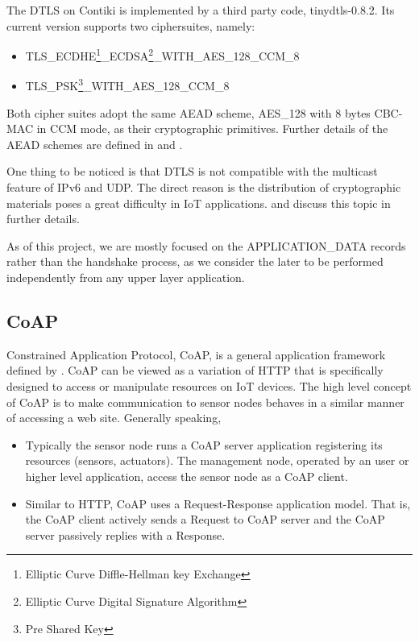 The DTLS on Contiki is implemented by a third party code, tinydtls-0.8.2\cite{tinydtls}. Its current version supports two ciphersuites, namely:
\begin{itemize}
	\item TLS\_ECDHE\footnote{Elliptic Curve Diffle-Hellman key Exchange}\_ECDSA\footnote{Elliptic Curve Digital Signature Algorithm}\_WITH\_AES\_128\_CCM\_8\cite{rfc7251}
	\item TLS\_PSK\footnote{Pre Shared Key}\_WITH\_AES\_128\_CCM\_8\cite{rfc6655}
\end{itemize}
Both cipher suites adopt the same AEAD scheme, AES\_128 with 8 bytes CBC-MAC in CCM mode, as their cryptographic primitives. Further details of the AEAD schemes are defined in \cite{rfc5116} and \cite{CCM}.

One thing to be noticed is that DTLS is not compatible with the multicast feature of IPv6 and UDP. The direct reason is the distribution of cryptographic materials poses a great difficulty in IoT applications. \cite{DtlsMulticast1} and \cite{DtlsMulticast2} discuss this topic in further details.

As of this project, we are mostly focused on the APPLICATION\_DATA records rather than the handshake process, as we consider the later to be performed independently from any upper layer application.

\subsection{CoAP} \label{Subsec: CoAP}
Constrained Application Protocol, CoAP, is a general application framework defined by \cite{rfc7252}. CoAP can be viewed as a variation of HTTP that is specifically designed to access or manipulate resources on IoT devices. The high level concept of CoAP is to make communication to sensor nodes behaves in a similar manner of accessing a web site. Generally speaking,
\begin{itemize}
	\item Typically the sensor node runs a CoAP server application registering its resources (sensors, actuators). The management node, operated by an user or higher level application, access the sensor node as a CoAP client. 
	\item Similar to HTTP, CoAP uses a Request-Response application model. That is, the CoAP client actively sends a Request to CoAP server and the CoAP server passively replies with a Response.
\end{itemize}

